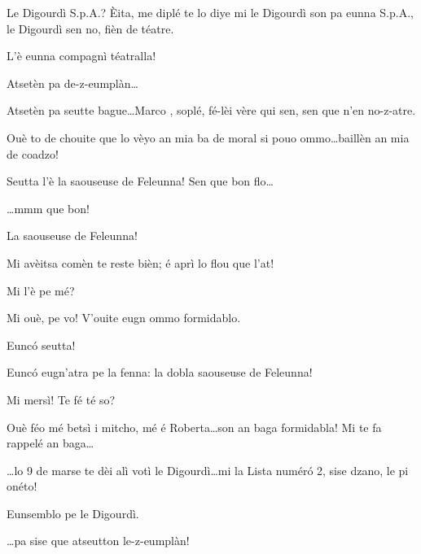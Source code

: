 \begin{drama}
\Marcospeaks Le Digourdì S.p.A.? Èita, me diplé te lo diye mi le Digourdì son pa eunna S.p.A., le Digourdì sen no, fièn de téatre.

\Cimaspeaks L'è eunna compagnì téatralla!

\Marcospeaks Atsetèn pa de-z-eumplàn\ldots

\Cimaspeaks Atsetèn pa seutte bague\ldots Marco , soplé, fé-lèi vère qui sen, sen que n'en no-z-atre.

\Marcospeaks Ouè to de chouite que lo vèyo an mia ba de moral si pouo ommo\ldots baillèn an mia de coadzo!


\Cimaspeaks {} Seutta l'è la saouseuse de Feleunna! Sen que bon flo\ldots

\Jeanspeaks {} \ldots mmm que bon!

\Cimaspeaks La saouseuse de Feleunna!

 
 Mi avèitsa comèn te reste bièn; é aprì lo flou que l'at!

\Jeanspeaks Mi l'è pe mé?

\Cimaspeaks Mi ouè, pe vo! V'ouite eugn ommo formidablo.


\Marcospeaks Eunc\'o seutta!

\Cimaspeaks Eunc\'o eugn'atra pe la fenna: la dobla saouseuse de Feleunna!

\Jeanspeaks Mi mersì! Te fé té so?

\Cimaspeaks Ouè féo mé betsì i mitcho, mé é Roberta\ldots son an baga formidabla! Mi te fa rappelé an baga\ldots


\Cimaspeaks \ldots lo 9 de marse te dèi alì votì le Digourdì\ldots mi la Lista num\'er\'o 2, sise dzano, le pi onéto!


\Jeanspeaks {} \og Eunsemblo pe le Digourdì\fg.

\Marcospeaks \ldots pa sise que atseutton le-z-eumplàn!


\end{drama}
